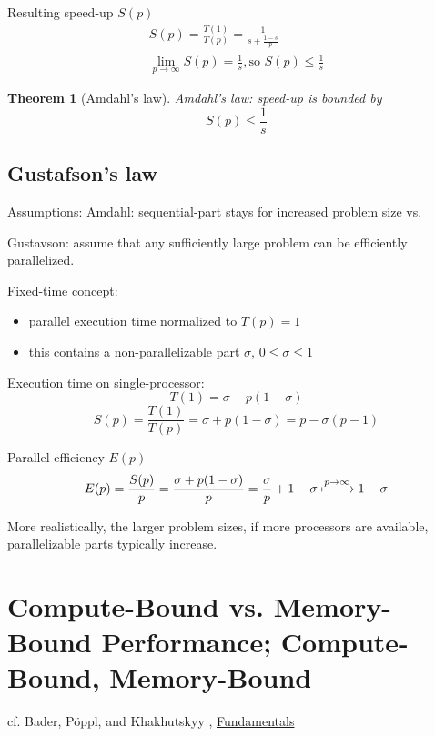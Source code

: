 \documentclass[10pt]{amsart}
\newtheorem{theorem}{Theorem}
\begin{document}
\begin{multicols*}{2}
Resulting speed-up $S(p)$ 
\begin{equation}
\begin{gathered}
S(p) = \frac{T(1)}{T(p)} = \frac{1}{ s + \frac{1-s}{p} }   \\
\lim_{p\to \infty} S(p) = \frac{1}{s} , \text{so } S(p) \leq \frac{1}{s}
\end{gathered}
\end{equation}

\begin{theorem}[Amdahl's law]
	Amdahl's law: speed-up is bounded by 
	\begin{equation}
\boxed{	S(p) \leq \frac{1}{s} }
	\end{equation}
\end{theorem}


\subsection{Gustafson's law}  

Assumptions: Amdahl: sequential-part stays for increased problem size vs.  

Gustavson: assume that any sufficiently large problem can be efficiently parallelized.  

Fixed-time concept:
\begin{itemize}
	\item parallel execution time normalized to $T(p)=1$
	\item this contains a non-parallelizable part $\sigma$, $0\leq \sigma \leq 1$
\end{itemize}

Execution time on single-processor:
\[
T(1) = \sigma + p(1-\sigma)
\]
\[
S(p) = \frac{T(1)}{T(p)} = \sigma + p(1-\sigma) = p-\sigma(p-1)
\]

Parallel efficiency $E(p)$
\[
E(p) = \frac{S(p)}{p} = \frac{ \sigma + p(1-\sigma) }{p} = \frac{\sigma}{p} + 1-\sigma \xmapsto{ p \to \infty} 1-\sigma
\]

More realistically, the larger problem sizes, if more processors are available, parallelizable parts typically increase.  

\section{Compute-Bound vs. Memory-Bound Performance; Compute-Bound, Memory-Bound}
cf. Bader, P\"{o}ppl, and Khakhutskyy \cite{BaPK2016}, \href{https://www5.in.tum.de/lehre/vorlesungen/hpc/WS16/fundamentals.pdf}{Fundamentals}



\end{multicols*}
\end{document}

